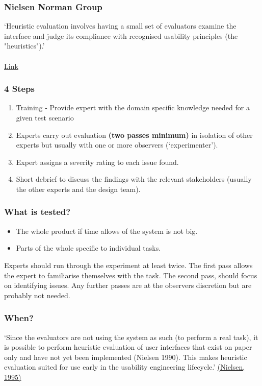 \begin{frame}
	\frametitle{Nielsen Norman Group}
	`Heuristic evaluation involves having a small set of evaluators examine the interface and judge its compliance with recognised usability principles (the "heuristics").' \\~\\
	\href{https://www.nngroup.com/articles/how-to-conduct-a-heuristic-evaluation/}{Link}
\end{frame}

\begin{frame}
	\frametitle{4 Steps}
	
	\begin{enumerate}
		\item Training - Provide expert with the domain specific knowledge needed for a given test scenario
 		\item Experts carry out evaluation \textbf{(two passes minimum)} in isolation of other experts but usually with one or more observers (`experimenter').
		\item Expert assigns a severity rating to each issue found.
		\item Short debrief to discuss the findings with the relevant stakeholders (usually the other experts and the design team).
	\end{enumerate}
\end{frame}

\begin{frame}
	\frametitle{What is tested?}
	\begin{itemize}
		\item The whole product if time allows of the system is not big.
		\item Parts of the whole specific to individual tasks. 
	\end{itemize}
	
	Experts should run through the experiment at least twice. The first pass allows the expert to familiarise themselves with the task. The second pass, should focus on identifying issues. Any further passes are at the observers discretion but are probably not needed. 

\end{frame}

\begin{frame}
	\frametitle{When?}
	
	`Since the evaluators are not using the system as such (to perform a real task), it is possible to perform heuristic evaluation of user interfaces that exist on paper only and have not yet been implemented (Nielsen 1990). This makes heuristic evaluation suited for use early in the usability engineering lifecycle.' \href{https://www.nngroup.com/articles/how-to-conduct-a-heuristic-evaluation/}{(Nielsen, 1995) }
\end{frame}

